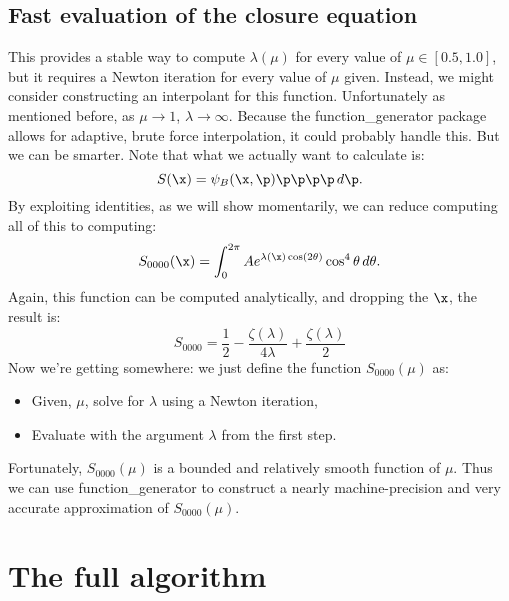 \documentclass{article}
\begin{document}
\subsection{Fast evaluation of the closure equation}

This provides a stable way to compute $\lambda(\mu)$ for every value of $\mu\in[0.5, 1.0]$, but it requires a Newton iteration for every value of $\mu$ given. Instead, we might consider constructing an interpolant for this function. Unfortunately as mentioned before, as $\mu\to1$, $\lambda\to\infty$. Because the function\_generator package allows for adaptive, brute force interpolation, it could probably handle this. But we can be smarter. Note that what we actually want to calculate is:
\begin{equation}
    S(\x) = \psi_B(\x,\p)\p\p\p\p\,d\p.
\end{equation}
By exploiting identities, as we will show momentarily, we can reduce computing all of this to computing:
\begin{equation}
    S_{0000}(\x) = \int_0^{2\pi}Ae^{\lambda(\x)\cos(2\theta)}\cos^4\theta\,d\theta.
\end{equation}
Again, this function can be computed analytically, and dropping the $\x$, the result is:
\begin{equation}
    S_{0000} = \frac{1}{2} - \frac{\zeta(\lambda)}{4\lambda} + \frac{\zeta(\lambda)}{2}
    \label{eqn:bingham_integral}
\end{equation}
Now we're getting somewhere: we just define the function $S_{0000}(\mu)$ as:
\begin{itemize}
    \item Given, $\mu$, solve  for $\lambda$ using a Newton iteration,
    \item Evaluate  with the argument $\lambda$ from the first step.
\end{itemize}
Fortunately, $S_{0000}(\mu)$ is a bounded and relatively smooth function of $\mu$. Thus we can use function\_generator to construct a nearly machine-precision and very accurate approximation of $S_{0000}(\mu)$.

\section{The full algorithm}
\end{document}
